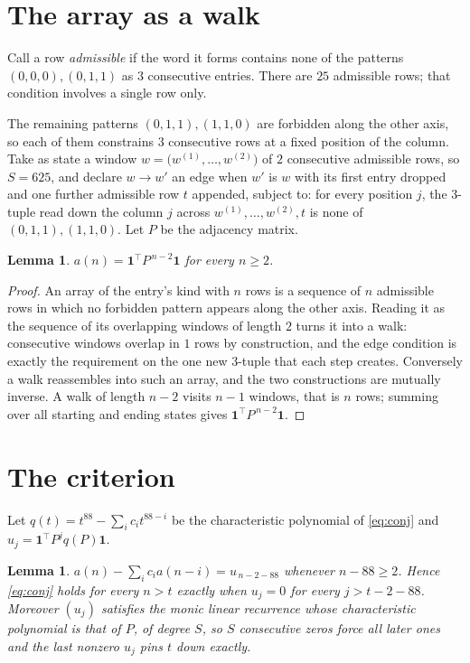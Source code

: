 \documentclass[11pt,a4paper]{article}
\theoremstyle{plain}
\newtheorem{lemma}[theorem]{Lemma}
\theoremstyle{definition}
\begin{document}
\section{The array as a walk}

Call a row \emph{admissible} if the word it forms contains none of the patterns
$(0,0,0), (0,1,1)$ as $3$ consecutive entries. There are $25$ admissible rows; that condition
involves a single row only.

The remaining patterns $(0,1,1), (1,1,0)$ are forbidden along the other axis, so each of them
constrains $3$ consecutive rows at a fixed position of the column. Take as state a
window $w=\bigl(w^{(1)},\dots,w^{(2)}\bigr)$ of $2$ consecutive admissible
rows, so $S=625$, and declare $w\to w'$ an edge when $w'$ is $w$ with its first entry
dropped and one further admissible row $t$ appended, subject to: for every position
$j$, the $3$-tuple read down the column $j$ across $w^{(1)},\dots,w^{(2)},t$
is none of $(0,1,1), (1,1,0)$. Let $P$ be the adjacency matrix.

\begin{lemma}\label{lem:walk}
$a(n)=\mathbf{1}^{\!\top}P^{\,n-2}\mathbf{1}$ for every $n\ge2$.
\end{lemma}

\begin{proof}
An array of the entry's kind with $n$ rows is a sequence of $n$ admissible rows in
which no forbidden pattern appears along the other axis. Reading it as the sequence of its
overlapping windows of length $2$ turns it into a walk: consecutive windows overlap in
$1$ rows by construction, and the edge condition is exactly the requirement on the one
new $3$-tuple that each step creates. Conversely a walk reassembles into such an array,
and the two constructions are mutually inverse. A walk of length $n-2$ visits $n-1$
windows, that is $n$ rows; summing over all starting and ending states gives
$\mathbf{1}^{\!\top}P^{\,n-2}\mathbf{1}$.
\end{proof}

\section{The criterion}

Let $q(t)=t^{88}-\sum_i c_i t^{88-i}$ be the characteristic polynomial of
\eqref{eq:conj} and $u_j=\mathbf{1}^{\!\top}P^{j}q(P)\mathbf{1}$.

\begin{lemma}\label{lem:crit}
$a(n)-\sum_i c_i a(n-i)=u_{\,n-2-88}$ whenever $n-88\ge2$. Hence
\eqref{eq:conj} holds for every $n>t$ exactly when $u_j=0$ for every
$j>t-2-88$. Moreover $(u_j)$ satisfies the monic linear recurrence whose
characteristic polynomial is that of $P$, of degree $S$, so $S$ consecutive zeros force all
later ones and the last nonzero $u_j$ pins $t$ down exactly.
\end{lemma}
\end{document}
